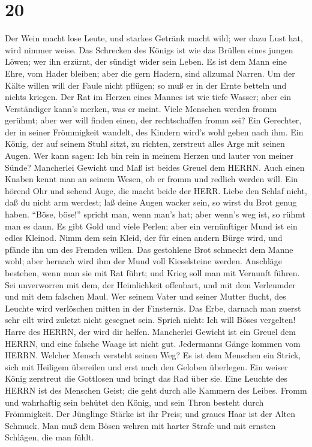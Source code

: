 \hypertarget{section-19}{%
\section{20}\label{section-19}}

 Der Wein macht lose Leute, und starkes Getränk macht wild;
wer dazu Lust hat, wird nimmer weise.  Das Schrecken des
Königs ist wie das Brüllen eines jungen Löwen; wer ihn erzürnt, der
sündigt wider sein Leben.  Es ist dem Mann eine Ehre, vom
Hader bleiben; aber die gern Hadern, sind allzumal Narren. 
Um der Kälte willen will der Faule nicht pflügen; so muß er in der Ernte
betteln und nichts kriegen.  Der Rat im Herzen eines Mannes
ist wie tiefe Wasser; aber ein Verständiger kann's merken, was er meint.
 Viele Menschen werden fromm gerühmt; aber wer will finden
einen, der rechtschaffen fromm sei?  Ein Gerechter, der in
seiner Frömmigkeit wandelt, des Kindern wird's wohl gehen nach ihm.
 Ein König, der auf seinem Stuhl sitzt, zu richten,
zerstreut alles Arge mit seinen Augen.  Wer kann sagen: Ich
bin rein in meinem Herzen und lauter von meiner Sünde? 
Mancherlei Gewicht und Maß ist beides Greuel dem HERRN. 
Auch einen Knaben kennt man an seinem Wesen, ob er fromm und redlich
werden will.  Ein hörend Ohr und sehend Auge, die macht
beide der HERR.  Liebe den Schlaf nicht, daß du nicht arm
werdest; laß deine Augen wacker sein, so wirst du Brot genug haben.
 ``Böse, böse!'' spricht man, wenn man's hat; aber wenn's
weg ist, so rühmt man es dann.  Es gibt Gold und viele
Perlen; aber ein vernünftiger Mund ist ein edles Kleinod. 
Nimm dem sein Kleid, der für einen andern Bürge wird, und pfände ihn um
des Fremden willen.  Das gestohlene Brot schmeckt dem Manne
wohl; aber hernach wird ihm der Mund voll Kieselsteine werden.
 Anschläge bestehen, wenn man sie mit Rat führt; und Krieg
soll man mit Vernunft führen.  Sei unverworren mit dem, der
Heimlichkeit offenbart, und mit dem Verleumder und mit dem falschen
Maul.  Wer seinem Vater und seiner Mutter flucht, des
Leuchte wird verlöschen mitten in der Finsternis.  Das
Erbe, darnach man zuerst sehr eilt wird zuletzt nicht gesegnet sein.
 Sprich nicht: Ich will Böses vergelten! Harre des HERRN,
der wird dir helfen.  Mancherlei Gewicht ist ein Greuel dem
HERRN, und eine falsche Waage ist nicht gut.  Jedermanns
Gänge kommen vom HERRN. Welcher Mensch versteht seinen Weg?
 Es ist dem Menschen ein Strick, sich mit Heiligem
übereilen und erst nach den Geloben überlegen.  Ein weiser
König zerstreut die Gottlosen und bringt das Rad über sie. 
Eine Leuchte des HERRN ist des Menschen Geist; die geht durch alle
Kammern des Leibes.  Fromm und wahrhaftig sein behütet den
König, und sein Thron besteht durch Frömmigkeit.  Der
Jünglinge Stärke ist ihr Preis; und graues Haar ist der Alten Schmuck.
 Man muß dem Bösen wehren mit harter Strafe und mit ernsten
Schlägen, die man fühlt.

